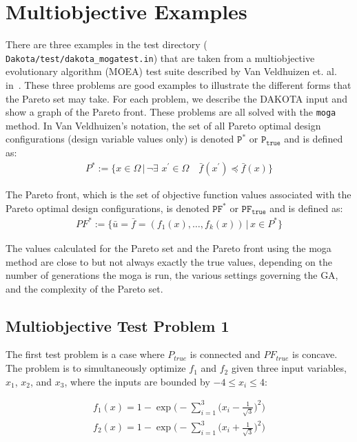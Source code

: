 \section{Multiobjective Examples}\label{additional:multiobjective}

There are three examples in the test directory ({\tt
Dakota/test/dakota\_mogatest.in}) that are taken from a multiobjective
evolutionary algorithm (MOEA) test suite described by Van Veldhuizen
et. al. in~\cite{Coe02}.  These three problems are good examples to
illustrate the different forms that the Pareto set may take. For each
problem, we describe the DAKOTA input and show a graph of the Pareto
front.  These problems are all solved with the \texttt{moga} method.
In Van Veldhuizen's notation, the set of all Pareto optimal design
configurations (design variable values only) is denoted $\mathtt{P^*}$
or $\mathtt{P_{true}}$ and is defined as:
\begin{eqnarray*}
  P^*:=\{x\in\Omega\,|\,\neg\exists\,\,
  x^\prime\in\Omega\quad\bar{f}(x^\prime)\preceq\bar{f}(x)\}
\end{eqnarray*}

The Pareto front, which is the set of objective function values
associated with the Pareto optimal design configurations, is denoted
$\mathtt{PF^*}$ or $\mathtt{PF_{true}}$ and is defined as:
\begin{eqnarray*}
  PF^*:=\{\bar{u}=\bar{f}=(f_1(x),\ldots,f_k(x))\,|\, x\in P^*\}
\end{eqnarray*}

The values calculated for the Pareto set and the Pareto front using
the moga method are close to but not always exactly the true values,
depending on the number of generations the moga is run, the various
settings governing the GA, and the complexity of the Pareto set.

\subsection{Multiobjective Test Problem 1}\label{additional:multiobjective:problem1}

The first test problem is a case where $P_{true}$ is connected and
$PF_{true}$ is concave.  The problem is to simultaneously optimize
$f_1$ and $f_2$ given three input variables, $x_1$, $x_2$, and
$x_3$, where the inputs are bounded by $-4 \leq x_{i} \leq 4$:

\begin{eqnarray*}
f_1(x)=1-\exp\Bigg(-\sum_{i=1}^3 \bigg(x_{i}-\frac{1}{\sqrt{3}}\bigg)^2\Bigg) \\
f_2(x)=1-\exp\Bigg(-\sum_{i=1}^3 \bigg(x_{i}+\frac{1}{\sqrt{3}}\bigg)^2\Bigg)
\end{eqnarray*}

